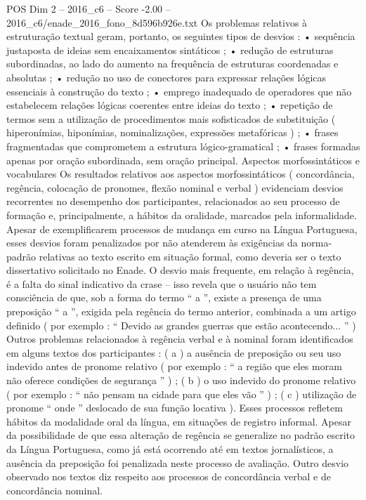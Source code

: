 \begin{textsample}{POS Dim 2 – 2016\_c6 – Score -2.00 – 2016\_c6/enade\_2016\_fono\_8d596b926e.txt}
Os problemas relativos à estruturação textual geram, portanto, os seguintes tipos de desvios : • sequência justaposta de ideias sem encaixamentos sintáticos ; • redução de estruturas subordinadas, ao lado do aumento na frequência de estruturas coordenadas e absolutas ; • redução no uso de conectores para expressar relações lógicas essenciais à construção do texto ; • emprego inadequado de operadores que não estabelecem relações lógicas coerentes entre ideias do texto ; • repetição de termos sem a utilização de procedimentos mais sofisticados de substituição ( hiperonímias, hiponímias, nominalizações, expressões metafóricas ) ; • frases fragmentadas que comprometem a estrutura lógico-gramatical ; • frases formadas apenas por oração subordinada, sem oração principal.
Aspectos morfossintáticos e vocabulares Os resultados relativos aos aspectos morfossintáticos ( concordância, regência, colocação de pronomes, flexão nominal e verbal ) evidenciam desvios recorrentes no desempenho dos participantes, relacionados ao seu processo de formação e, principalmente, a hábitos da oralidade, marcados pela informalidade.
Apesar de exemplificarem processos de mudança em curso na Língua Portuguesa, esses desvios foram penalizados por não atenderem às exigências da norma-padrão relativas ao texto escrito em situação formal, como deveria ser o texto dissertativo solicitado no Enade.
O desvio mais frequente, em relação à regência, é a falta do sinal indicativo da crase – isso revela que o usuário não tem consciência de que, sob a forma do termo “ a ”, existe a presença de uma preposição “ a ”, exigida pela regência do termo anterior, combinada a um artigo definido ( por exemplo : “ Devido as grandes guerras que estão acontecendo... ” ) Outros problemas relacionados à regência verbal e à nominal foram identificados em alguns textos dos participantes : ( a ) a ausência de preposição ou seu uso indevido antes de pronome relativo ( por exemplo : “ a região que eles moram não oferece condições de segurança ” ) ; ( b ) o uso indevido do pronome relativo ( por exemplo : “ não pensam na cidade para que eles vão ” ) ; ( c ) utilização de pronome “ onde ” deslocado de sua função locativa ).
Esses processos refletem hábitos da modalidade oral da língua, em situações de registro informal.
Apesar da possibilidade de que essa alteração de regência se generalize no padrão escrito da Língua Portuguesa, como já está ocorrendo até em textos jornalísticos, a ausência da preposição foi penalizada neste processo de avaliação.
Outro desvio observado nos textos diz respeito aos processos de concordância verbal e de concordância nominal.

\end{textsample}
